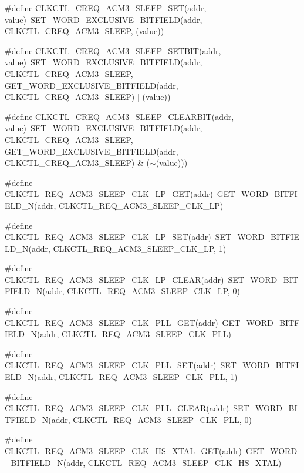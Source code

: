 \begin{DoxyCompactItemize}
\#define \hyperlink{a00544_ac80731fe9c719144d5326f6d81e10c52}{CLKCTL\_\-CREQ\_\-ACM3\_\-SLEEP\_\-SET}(addr, value)~SET\_\-WORD\_\-EXCLUSIVE\_\-BITFIELD(addr, CLKCTL\_\-CREQ\_\-ACM3\_\-SLEEP, (value))
\item 
\#define \hyperlink{a00544_a5f9fe035f80e91f518822e7bd09274ff}{CLKCTL\_\-CREQ\_\-ACM3\_\-SLEEP\_\-SETBIT}(addr, value)~SET\_\-WORD\_\-EXCLUSIVE\_\-BITFIELD(addr, CLKCTL\_\-CREQ\_\-ACM3\_\-SLEEP, GET\_\-WORD\_\-EXCLUSIVE\_\-BITFIELD(addr, CLKCTL\_\-CREQ\_\-ACM3\_\-SLEEP) $|$ (value))
\item 
\#define \hyperlink{a00544_a1e525c39fe69e4b7699d79205e922124}{CLKCTL\_\-CREQ\_\-ACM3\_\-SLEEP\_\-CLEARBIT}(addr, value)~SET\_\-WORD\_\-EXCLUSIVE\_\-BITFIELD(addr, CLKCTL\_\-CREQ\_\-ACM3\_\-SLEEP, GET\_\-WORD\_\-EXCLUSIVE\_\-BITFIELD(addr, CLKCTL\_\-CREQ\_\-ACM3\_\-SLEEP) \& ($\sim$(value)))
\item 
\#define \hyperlink{a00544_a89e08ab7c3718a20291a146b63bbce1b}{CLKCTL\_\-REQ\_\-ACM3\_\-SLEEP\_\-CLK\_\-LP\_\-GET}(addr)~GET\_\-WORD\_\-BITFIELD\_\-N(addr, CLKCTL\_\-REQ\_\-ACM3\_\-SLEEP\_\-CLK\_\-LP)
\item 
\#define \hyperlink{a00544_a53df44868afa3bb189399d82ca828159}{CLKCTL\_\-REQ\_\-ACM3\_\-SLEEP\_\-CLK\_\-LP\_\-SET}(addr)~SET\_\-WORD\_\-BITFIELD\_\-N(addr, CLKCTL\_\-REQ\_\-ACM3\_\-SLEEP\_\-CLK\_\-LP, 1)
\item 
\#define \hyperlink{a00544_a95b1b4b8b62307ed572ba1259eb320c3}{CLKCTL\_\-REQ\_\-ACM3\_\-SLEEP\_\-CLK\_\-LP\_\-CLEAR}(addr)~SET\_\-WORD\_\-BITFIELD\_\-N(addr, CLKCTL\_\-REQ\_\-ACM3\_\-SLEEP\_\-CLK\_\-LP, 0)
\item 
\#define \hyperlink{a00544_a197cfb35dfcd5417a6fca4008b171da1}{CLKCTL\_\-REQ\_\-ACM3\_\-SLEEP\_\-CLK\_\-PLL\_\-GET}(addr)~GET\_\-WORD\_\-BITFIELD\_\-N(addr, CLKCTL\_\-REQ\_\-ACM3\_\-SLEEP\_\-CLK\_\-PLL)
\item 
\#define \hyperlink{a00544_a7e8a4bd1262c0eb5f046142c994ce1d0}{CLKCTL\_\-REQ\_\-ACM3\_\-SLEEP\_\-CLK\_\-PLL\_\-SET}(addr)~SET\_\-WORD\_\-BITFIELD\_\-N(addr, CLKCTL\_\-REQ\_\-ACM3\_\-SLEEP\_\-CLK\_\-PLL, 1)
\item 
\#define \hyperlink{a00544_a4a7249b9cbf7b783919ff85b7e278389}{CLKCTL\_\-REQ\_\-ACM3\_\-SLEEP\_\-CLK\_\-PLL\_\-CLEAR}(addr)~SET\_\-WORD\_\-BITFIELD\_\-N(addr, CLKCTL\_\-REQ\_\-ACM3\_\-SLEEP\_\-CLK\_\-PLL, 0)
\item 
\#define \hyperlink{a00544_abcf478b3a4133767a389fc6aba60a948}{CLKCTL\_\-REQ\_\-ACM3\_\-SLEEP\_\-CLK\_\-HS\_\-XTAL\_\-GET}(addr)~GET\_\-WORD\_\-BITFIELD\_\-N(addr, CLKCTL\_\-REQ\_\-ACM3\_\-SLEEP\_\-CLK\_\-HS\_\-XTAL)

\end{DoxyCompactItemize}
